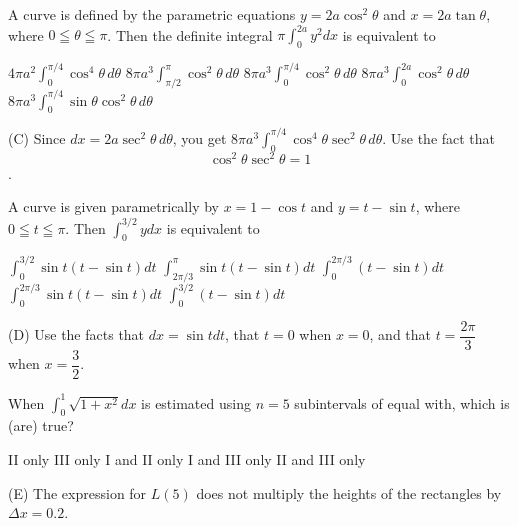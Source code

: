 \question
A curve is defined by the parametric equations $y=2 a \cos ^{2} \theta$ and $x=2 a \tan \theta$, where $0 \leqq \theta \leqq \pi$. Then the definite integral $\pi \int_{0}^{2 a} y^{2} d x$ is equivalent to
\begin{choices}
  \choice $4 \pi a^{2} \int_{0}^{\pi / 4} \cos ^{4} \theta\,d\theta$
  \choice $8 \pi a^{3} \int_{\pi / 2}^{\pi} \cos ^{2} \theta\,d\theta$
  \CorrectChoice $8 \pi a^{3} \int_{0}^{\pi / 4} \cos ^{2} \theta\,d\theta$
  \choice $8 \pi a^{3} \int_{0}^{2 a} \cos ^{2} \theta\,d\theta$
  \choice $8 \pi a^{3} \int_{0}^{\pi / 4} \sin \theta \cos ^{2} \theta\,d\theta$
\end{choices}
\begin{solution}
(C) Since $d x=2 a \sec ^{2} \theta\,d\theta$, you get $8 \pi a^{3} \int_{0}^{\pi / 4} \cos ^{4} \theta \sec ^{2} \theta\,d\theta$. Use the fact that $$\cos ^{2} \theta \sec ^{2} \theta=1$$.
\end{solution}




\newpage




\question
A curve is given parametrically by $x=1-\cos t$ and $y=t-\sin t$, where $0 \leqq t \leqq \pi$. Then $\int_{0}^{3 / 2} y d x$ is equivalent to
\begin{choices}
  \choice $\int_{0}^{3 / 2} \sin t(t-\sin t) d t$
  \choice $\int_{2 \pi / 3}^{\pi} \sin t(t-\sin t) d t$
  \choice $\int_{0}^{2 \pi / 3}(t-\sin t) d t$
  \CorrectChoice $\int_{0}^{2 \pi / 3} \sin t(t-\sin t) d t$
  \choice $\int_{0}^{3 / 2}(t-\sin t) d t$
\end{choices}
\begin{solution}
(D) Use the facts that $d x=\sin t d t$, that $t=0$ when $x=0$, and that $t=\dfrac{2 \pi}{3}$ when $x=\dfrac{3}{2}$.
\end{solution}

\question
When $\int_{0}^{1} \sqrt{1+x^{2}} d x$ is estimated using $n=5$ subintervals of equal with, which is (are) true?

\begin{choices}
  \choice II only
  \choice III only
  \choice I and II only
  \choice I and III only
  \CorrectChoice II and III only
\end{choices}
\begin{solution}
(E) The expression for $L(5)$ does not multiply the heights of the rectangles by $\Delta x=0.2$.
\end{solution}

